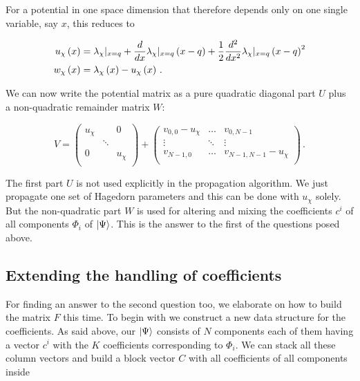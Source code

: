 For a potential in one space dimension that therefore depends only on one single
variable, say $x$, this reduces to

\begin{equation} \label{eq:pot_taylor_split_1d}
\begin{split}
  u_\chi\left( x \right) & = \lambda_\chi|_{x=q} + \frac{d}{dx}\lambda_\chi|_{x=q}\left( x-q \right) + \frac{1}{2} \frac{d^2}{dx^2}\lambda_\chi|_{x=q} \left( x-q \right)^2 \\
  w_\chi\left( x \right) & = \lambda_\chi\left( x \right) - u_\chi\left( x \right) \,.
\end{split}
\end{equation}

We can now write the potential matrix as a pure quadratic diagonal part $U$
plus a non-quadratic remainder matrix $W$:

\begin{equation} \label{eq:potiential_splitting_leading}
  V =
  \begin{pmatrix}
    u_\chi & {}     & 0 \\
    {}     & \ddots & {} \\
    0      & {}     & u_\chi \\
  \end{pmatrix}
  +
  \begin{pmatrix}
    v_{0,0} - u_\chi & \hdots & v_{0,N-1} \\
    \vdots           & \ddots & \vdots \\
    v_{N-1,0}        & \hdots & v_{N-1,N-1} - u_\chi \\
  \end{pmatrix} \,.
\end{equation}

The first part $U$ is not used explicitly in the propagation algorithm. We just
propagate one set of Hagedorn parameters and this can be done with $u_\chi$ solely. But
the non-quadratic part $W$ is used for altering and mixing the coefficients $c^i$ of
all components $\Phi_i$ of $\Ket{\Psi}$. This is the answer to the first of the questions posed above.

\subsection{Extending the handling of coefficients}
\label{sec:extending_the_handling_of_coefficients}

For finding an answer to the second question too, we elaborate on how to build the matrix $F$ this time.
To begin with we construct a new data structure for the coefficients. As said above, our $\Ket{\Psi}$
consists of $N$ components each of them having a vector $c^i$ with the $K$ coefficients
corresponding to $\Phi_i$. We can stack all these column vectors and build
a block vector $C$ with all coefficients of all components inside

